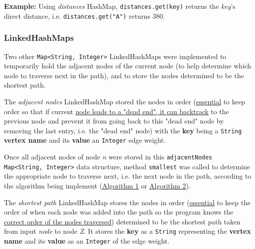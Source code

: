 \vspace*{\baselineskip}
\textbf{Example:} Using \emph{distances} HashMap, \texttt{distances.get(key)} returns the \emph{key}'s direct distance, i.e. \texttt{distances.get("A")} returns 380.


\subsubsection*{LinkedHashMaps}
Two other \texttt{Map<String, Integer>} LinkedHashMaps were implemented to temporarily hold the adjacent nodes of the current node (to help determine which node to traverse next in the path), and to store the nodes determined to be the shortest path.

The \emph{adjacent nodes} LinkedHashMap stored the nodes in order (\underline{essential} to keep order so that if current \underline{node leads to a "dead end", it can backtrack} to the previous node and prevent it from going back to this "dead end" node by removing the last entry, i.e. the "dead end" node) with the \textbf{key} being a \texttt{String} \textbf{vertex name} and its \textbf{value} an \texttt{Integer} edge weight.

Once all adjacent nodes of node \emph{n} were stored in this \texttt{adjacentNodes Map<String, Integer>} data structure, method \texttt{smallest} was called to determine the appropriate node to traverse next, i.e. the next node in the path, according to the algorithm being implement (\hyperref[algo1]{Algorithm 1} or \hyperref[algo2]{Algorithm 2}).

The \emph{shortest path} LinkedHashMap stores the nodes in order (\underline{essential} to keep the order of when each node was added into the path so the program knows the \underline{correct order of the nodes traversed}) determined to be the shortest path taken from input \emph{node} to node \emph{Z}. It stores the \textbf{key} as a \texttt{String} representing the \textbf{vertex name} and its \textbf{value} as an \texttt{Integer} of the edge weight.

\newpage


